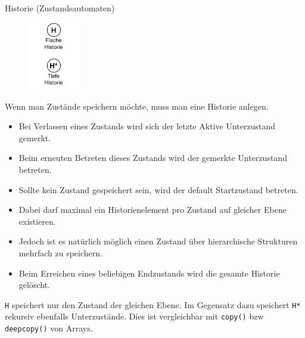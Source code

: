 \begin{defi}{Historie (Zustandsautomaten)}
    \begin{figure}
        \centering
        \includegraphics[width=0.2\textwidth]{includes/figures/defi_diagrams_state_history.pdf}
    \end{figure}
    Wenn man Zustände speichern möchte, muss man eine Historie anlegen.

    \begin{itemize}
        \item Bei Verlassen eines Zustands wird sich der letzte Aktive Unterzustand gemerkt.
        \item Beim erneuten Betreten dieses Zustands wird der gemerkte Unterzustand betreten.
        \item Sollte kein Zustand gespeichert sein, wird der default Startzustand betreten.
        \item Dabei darf maximal ein Historienelement pro Zustand auf gleicher Ebene existieren.
        \item Jedoch ist es natürlich möglich einen Zustand über hierarchische Strukturen mehrfach zu speichern.
        \item Beim Erreichen eines beliebigen Endzustands wird die gesamte Historie gelöscht.
    \end{itemize}

    \texttt{H} speichert nur den Zustand der gleichen Ebene.
    Im Gegensatz dazu speichert \texttt{H*} rekursiv ebenfalls Unterzustände. Dies ist vergleichbar mit \texttt{copy()} bzw \texttt{deepcopy()} von Arrays.
\end{defi}

